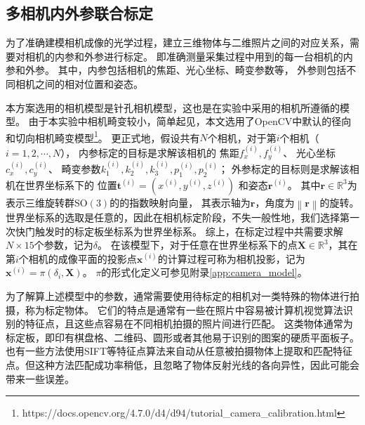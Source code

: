 \subsection{多相机内外参联合标定}
\label{sec:camera_calib}

为了准确建模相机成像的光学过程，建立三维物体与二维照片之间的对应关系，需要对相机的内参和外参进行标定。
即准确测量采集过程中用到的每一台相机的内参和外参。
其中，内参包括相机的焦距、光心坐标、畸变参数等，
外参则包括不同相机之间的相对位置和姿态。

本方案选用的相机模型是针孔相机模型，这也是在实验中采用的相机所遵循的模型。
由于本实验中相机畸变较小，简单起见，本文选用了OpenCV中默认的径向和切向相机畸变模型\footnote{https://docs.opencv.org/4.7.0/d4/d94/tutorial\_camera\_calibration.html}。
更正式地，假设共有$N$个相机，对于第$i$个相机（$i=1,2,\cdots,N$），
内参标定的目标是求解该相机的
焦距$f_x^{(i)},f_y^{(i)}$、
光心坐标$c_x^{(i)},c_y^{(i)}$、
畸变参数$k_1^{(i)},k_2^{(i)},k_3^{(i)},p_1^{(i)},p_2^{(i)}$；
外参标定的目标则是求解该相机在世界坐标系下的
位置$\mathbf{t}^{(i)}=\left(x^{(i)},y^{(i)},z^{(i)}\right)$
和姿态$\mathbf{r}^{(i)}$。
其中$\mathbf{r}\in \mathbb{R}^3$为表示三维旋转群$\mathrm{SO(3)}$的的指数映射向量，
其表示轴为$\mathbf{r}$，角度为$\left\| \mathbf{r}\right\|$的旋转。
世界坐标系的选取是任意的，因此在相机标定阶段，不失一般性地，我们选择第一次快门触发时的标定板坐标系为世界坐标系。
\def\camparam{\delta}
综上，在标定过程中共需要求解$N\times 15$个参数，记为$\camparam$。
在该模型下，对于任意在世界坐标系下的点$\mathbf{X}\in \mathbb{R}^3$，其在第$i$个相机的成像平面的投影点$\mathbf{x}^{(i)}$的计算过程可称为相机投影，记为$\mathbf{x}^{(i)}=\pi(\camparam_i, \mathbf{X})$。
$\pi$的形式化定义可参见附录\ref{app:camera_model}。

为了解算上述模型中的参数，通常需要使用待标定的相机对一类特殊的物体进行拍摄，称为标定物体。
它们的特点是通常有一些在照片中容易被计算机视觉算法识别的特征点，且这些点容易在不同相机拍摄的照片间进行匹配。
这类物体通常为标定板，即印有棋盘格、二维码、圆形或者其他易于识别的图案的硬质平面板子。
也有一些方法\cite{colmap}使用SIFT等特征点算法来自动从任意被拍摄物体上提取和匹配特征点。但这种方法匹配成功率稍低，且忽略了物体反射光线的各向异性，因此可能会带来一些误差。

